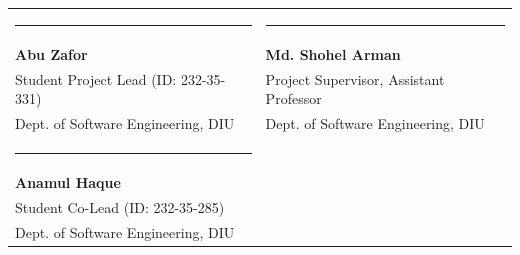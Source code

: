 \documentclass[10.5pt,a4paper]{article}
\begin{document}
\vspace{0.6cm}
\noindent
\begin{tabularx}{\linewidth}{X X}
\rule{2.7in}{0.5pt} & \rule{2.7in}{0.5pt}\\
\textbf{Abu Zafor} & \textbf{Md. Shohel Arman}\\
Student Project Lead (ID: 232-35-331) & Project Supervisor, Assistant Professor\\
Dept. of Software Engineering, DIU & Dept. of Software Engineering, DIU\\[0.6cm]
\rule{2.7in}{0.5pt} & \\
\textbf{Anamul Haque} & \\
Student Co-Lead (ID: 232-35-285) & \\
Dept. of Software Engineering, DIU & \\
\end{tabularx}
\end{document}

